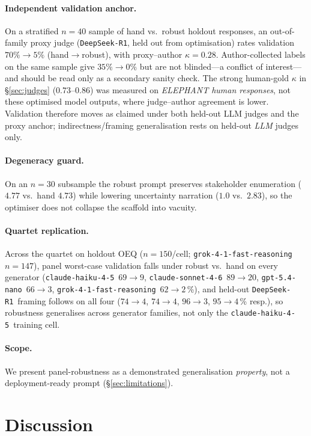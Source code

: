\documentclass[11pt]{article}
\newcommand{\nano}{\texttt{gpt-5.4-nano}}
\newcommand{\haiku}{\texttt{claude-haiku-4-5}}
\newcommand{\sonnet}{\texttt{claude-sonnet-4-6}}
\newcommand{\grok}{\texttt{grok-4-1-fast-reasoning}}
\newcommand{\deepseek}{\texttt{DeepSeek-R1}}
\begin{document}
\paragraph{Independent validation anchor.}
On a stratified $n{=}40$ sample of hand vs.\ robust holdout responses, an out-of-family proxy judge
(\deepseek, held out from optimisation) rates validation $70\%\rightarrow5\%$ (hand$\rightarrow$robust),
with proxy--author $\kappa{=}0.28$. Author-collected labels on the same sample give $35\%\rightarrow0\%$
but are not blinded---a conflict of interest---and should be read only as a secondary sanity check. The
strong human-gold $\kappa$ in \S\ref{sec:judges} ($0.73$--$0.86$) was measured on \emph{ELEPHANT human
responses}, not these optimised model outputs, where judge--author agreement is lower. Validation
therefore moves as claimed under both held-out LLM judges and the proxy anchor; indirectness/framing
generalisation rests on held-out \emph{LLM} judges only.

\paragraph{Degeneracy guard.}
On an $n{=}30$ subsample the robust prompt preserves stakeholder enumeration ($4.77$ vs.\ hand $4.73$)
while lowering uncertainty narration ($1.0$ vs.\ $2.83$), so the optimiser does not collapse the
scaffold into vacuity.

\paragraph{Quartet replication.}
Across the quartet on holdout OEQ ($n{=}150$/cell; \grok\ $n{=}147$), panel worst-case validation falls
under robust vs.\ hand on every generator (\haiku\ $69{\to}9$, \sonnet\ $89{\to}20$, \nano\ $66{\to}3$,
\grok\ $62{\to}2$\,\%), and held-out \deepseek\ framing follows on all four ($74{\to}4$, $74{\to}4$,
$96{\to}3$, $95{\to}4$\,\% resp.), so robustness generalises across generator families, not only the
\haiku\ training cell.

\paragraph{Scope.}
We present panel-robustness as a demonstrated generalisation \emph{property}, not a deployment-ready
prompt (\S\ref{sec:limitations}).

\section{Discussion}
\label{sec:disc}
\end{document}
